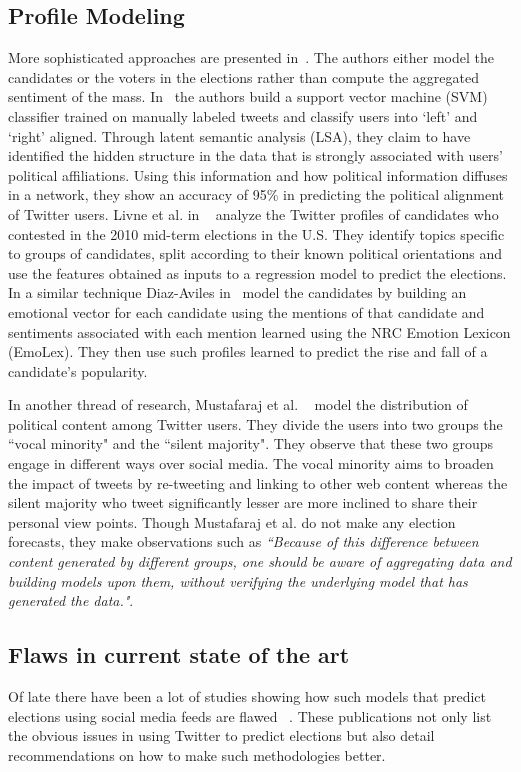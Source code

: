 \subsection{Profile Modeling}
More sophisticated approaches are presented in~\cite{livne2011party,conover2011predicting,diaz2012taking}. 
The authors either model the candidates or the voters in the elections rather than compute the aggregated sentiment of the mass.  
In~\cite{conover2011predicting} the authors build a support vector machine (SVM)
classifier trained on manually labeled tweets and classify users into `left' and `right' aligned.
Through latent semantic analysis (LSA),
they claim to have identified the hidden structure in the data that is strongly associated with 
users' political affiliations.
Using this information and how political information diffuses in a network, they show  an accuracy of 95\%  in 
predicting the political alignment of Twitter users.
Livne et al. in ~\cite{livne2011party} analyze the Twitter profiles of candidates who contested in 
the 2010 mid-term elections in the U.S. 
They identify topics specific to groups of candidates, split according to their known political orientations and use the features obtained as inputs to a regression model to predict the elections. 
In a similar technique Diaz-Aviles in~\cite{diaz2012taking} model the candidates by building an emotional vector for each candidate using the mentions of that candidate and sentiments associated with each mention learned using 
the NRC Emotion Lexicon (EmoLex). 
They then use such profiles learned to predict the rise and fall of a candidate's popularity.

In another thread of research, Mustafaraj et al. ~\cite{mustafaraj2011vocal} model the distribution of political content 
among Twitter users. 
They divide the users into two groups the ``vocal minority" and the ``silent majority". 
They observe that these two groups engage in different ways over social media.
The vocal minority aims to broaden the impact of tweets by re-tweeting and linking to other web content whereas 
the silent majority who tweet significantly lesser are more inclined to share their personal view points.
Though Mustafaraj et al. do not make any election forecasts, they make observations such as 
\emph{``Because of this difference between content generated by different groups, one should be 
aware of aggregating data and building models upon them, without verifying the underlying model 
that has generated the data."}.

\subsection{Flaws in current state of the art}
Of late there have been a lot of studies showing how such models that predict elections using social media feeds are flawed ~\cite{metaxas2011not,gayo2012wanted,gayo2011don,gayo2011limits}.
These publications not only list the obvious issues in using Twitter to predict elections but also detail recommendations on how to make such methodologies better.

